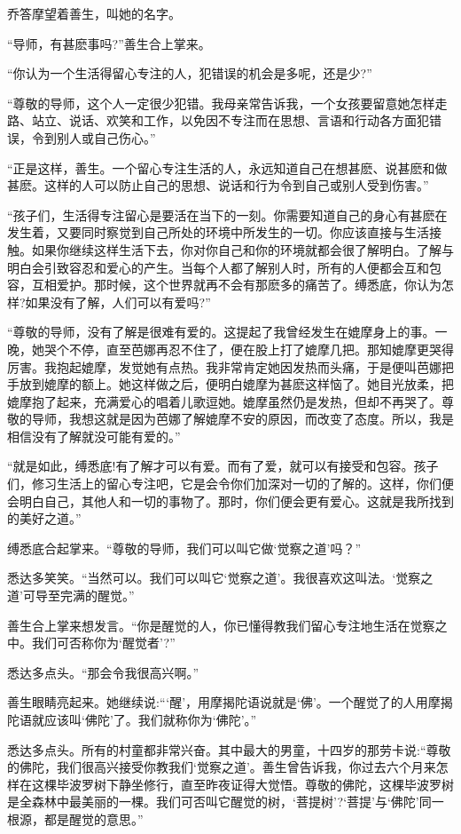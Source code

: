 \documentclass[12pt,twoside,openany]{book}
\begin{document}
乔答摩望着善生，叫她的名字。

“导师，有甚麽事吗?”善生合上掌来。

“你认为一个生活得留心专注的人，犯错误的机会是多呢，还是少?”

“尊敬的导师，这个人一定很少犯错。我母亲常告诉我，一个女孩要留意她怎样走路、站立、说话、欢笑和工作，以免因不专注而在思想、言语和行动各方面犯错误，令到别人或自己伤心。”

“正是这样，善生。一个留心专注生活的人，永远知道自己在想甚麽、说甚麽和做甚麽。这样的人可以防止自己的思想、说话和行为令到自己或别人受到伤害。”

“孩子们，生活得专注留心是要活在当下的一刻。你需要知道自己的身心有甚麽在发生着，又要同时察觉到自己所处的环境中所发生的一切。你应该直接与生活接触。如果你继续这样生活下去，你对你自己和你的环境就都会很了解明白。了解与明白会引致容忍和爱心的产生。当每个人都了解别人时，所有的人便都会互和包容，互相爱护。那时候，这个世界就再不会有那麽多的痛苦了。缚悉底，你认为怎样?如果没有了解，人们可以有爱吗?”

“尊敬的导师，没有了解是很难有爱的。这提起了我曾经发生在媲摩身上的事。一晚，她哭个不停，直至芭娜再忍不住了，便在股上打了媲摩几把。那知媲摩更哭得厉害。我抱起媲摩，发觉她有点热。我非常肯定她因发热而头痛，于是便叫芭娜把手放到媲摩的额上。她这样做之后，便明白媲摩为甚麽这样恼了。她目光放柔，把媲摩抱了起来，充满爱心的唱着儿歌逗她。媲摩虽然仍是发热，但却不再哭了。尊敬的导师，我想这就是因为芭娜了解媲摩不安的原因，而改变了态度。所以，我是相信没有了解就没可能有爱的。”

“就是如此，缚悉底!有了解才可以有爱。而有了爱，就可以有接受和包容。孩子们，修习生活上的留心专注吧，它是会令你们加深对一切的了解的。这样，你们便会明白自己，其他人和一切的事物了。那时，你们便会更有爱心。这就是我所找到的美好之道。”

缚悉底合起掌来。“尊敬的导师，我们可以叫它做‘觉察之道’吗？”

悉达多笑笑。“当然可以。我们可以叫它‘觉察之道’。我很喜欢这叫法。‘觉察之道’可导至完满的醒觉。”

善生合上掌来想发言。“你是醒觉的人，你已懂得教我们留心专注地生活在觉察之中。我们可否称你为‘醒觉者’?”

悉达多点头。“那会令我很高兴啊。”

善生眼睛亮起来。她继续说:“‘醒’，用摩揭陀语说就是‘佛’。一个醒觉了的人用摩揭陀语就应该叫‘佛陀’了。我们就称你为‘佛陀’。”

悉达多点头。所有的村童都非常兴奋。其中最大的男童，十四岁的那劳卡说:“尊敬的佛陀，我们很高兴接受你教我们‘觉察之道’。善生曾告诉我，你过去六个月来怎样在这棵毕波罗树下静坐修行，直至昨夜证得大觉悟。尊敬的佛陀，这棵毕波罗树是全森林中最美丽的一棵。我们可否叫它醒觉的树，‘菩提树’?‘菩提’与‘佛陀’同一根源，都是醒觉的意思。”
\end{document}
